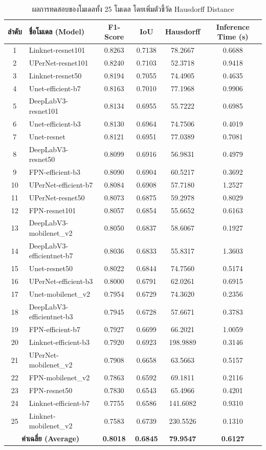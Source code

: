 \begin{table}[hbt!]
\centering
\caption{ผลการทดสอบของโมเดลทั้ง 25 โมเดล โดยเพิ่มตัวชี้วัด Hausdorff Distance}
\label{tab:all_models_hausdorff}
\begin{tabular}{|c|l|c|c|c|c|}
\hline
\textbf{ลำดับ} & \textbf{ชื่อโมเดล (Model)} & \textbf{F1-Score} & \textbf{IoU} & \textbf{Hausdorff} & \textbf{Inference Time (s)} \\
\hline
1 & Linknet-resnet101 & 0.8263 & 0.7138 & 78.2667 & 0.6688 \\
2 & UPerNet-resnet101 & 0.8240 & 0.7103 & 52.3718 & 0.9418 \\
3 & Linknet-resnet50 & 0.8194 & 0.7055 & 74.4905 & 0.4635 \\
4 & Unet-efficient-b7 & 0.8163 & 0.7010 & 77.1968 & 0.9906 \\
5 & DeepLabV3-resnet101 & 0.8134 & 0.6955 & 55.7222 & 0.6985 \\
6 & Unet-efficient-b3 & 0.8130 & 0.6964 & 74.7506 & 0.4019 \\
7 & Unet-resnet & 0.8121 & 0.6951 & 77.0389 & 0.7081 \\
8 & DeepLabV3-resnet50 & 0.8099 & 0.6916 & 56.9831 & 0.4979 \\
9 & FPN-efficient-b3 & 0.8090 & 0.6904 & 60.5217 & 0.3692 \\
10 & UPerNet-efficient-b7 & 0.8084 & 0.6908 & 57.7180 & 1.2527 \\
11 & UPerNet-resnet50 & 0.8073 & 0.6875 & 59.2978 & 0.8029 \\
12 & FPN-resnet101 & 0.8057 & 0.6854 & 55.6652 & 0.6163 \\
13 & DeepLabV3-mobilenet\_v2 & 0.8050 & 0.6837 & 58.6067 & 0.1927 \\
14 & DeepLabV3-efficientnet-b7 & 0.8036 & 0.6833 & 55.8317 & 1.3603 \\
15 & Unet-resnet50 & 0.8022 & 0.6844 & 74.7560 & 0.5174 \\
16 & UPerNet-efficient-b3 & 0.8000 & 0.6791 & 62.0261 & 0.6915 \\
17 & Unet-mobilenet\_v2 & 0.7954 & 0.6729 & 74.3620 & 0.2356 \\
18 & DeepLabV3-efficientnet-b3 & 0.7945 & 0.6728 & 57.6671 & 0.3783 \\
19 & FPN-efficient-b7 & 0.7927 & 0.6699 & 66.2021 & 1.0059 \\
20 & Linknet-efficient-b3 & 0.7920 & 0.6923 & 198.9889 & 0.3146 \\
21 & UPerNet-mobilenet\_v2 & 0.7908 & 0.6658 & 63.5663 & 0.5157 \\
22 & FPN-mobilenet\_v2 & 0.7863 & 0.6592 & 69.1811 & 0.2116 \\
23 & FPN-resnet50 & 0.7830 & 0.6543 & 65.4966 & 0.4201 \\
24 & Linknet-efficient-b7 & 0.7755 & 0.6586 & 141.6082 & 0.9310 \\
25 & Linknet-mobilenet\_v2 & 0.7583 & 0.6739 & 230.5526 & 0.1310 \\
\hline
\multicolumn{2}{|c|}{\textbf{ค่าเฉลี่ย (Average)}} & \textbf{0.8018} & \textbf{0.6845} & \textbf{79.9547} & \textbf{0.6127} \\
\hline
\end{tabular}
\end{table}

